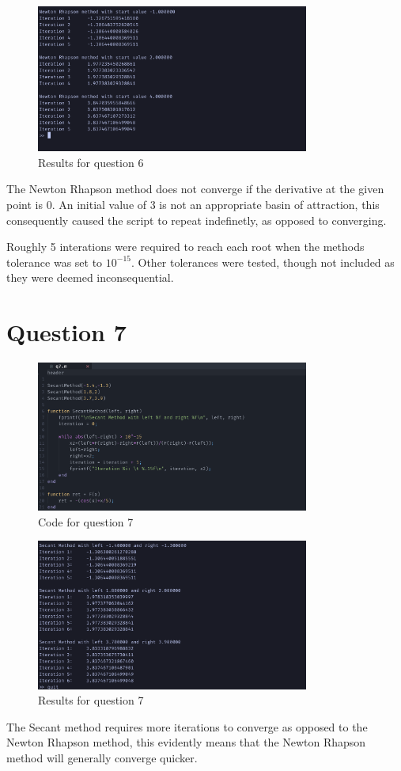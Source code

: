 \documentclass{article}
\begin{document}
\begin{figure}[H]
	\centering
	\includegraphics[width=0.8\textwidth]{imgs/q6_results.png}
	\caption{Results for question 6}
	\label{fig:q6_result}
\end{figure}
The Newton Rhapson method does not converge if the derivative at the given point is 0. An initial value of 3 is not an appropriate basin of attraction, this consequently caused the script to repeat indefinetly, as opposed to converging. 

Roughly 5 interations were required to reach each root when the methods tolerance was set to $10^{-15}$. Other tolerances were tested, though not included as they were deemed inconsequential.
\newpage
\section{Question 7}
\begin{figure}[H]
	\centering
	\includegraphics[width=0.8\textwidth]{imgs/q7_code.png}
	\caption{Code for question 7}
	\label{fig:q7_code}
\end{figure}

\begin{figure}[H]
	\centering
	\includegraphics[width=0.8\textwidth]{imgs/q7_results.png}
	\caption{Results for question 7}
	\label{fig:q7_result}
\end{figure}
The Secant method requires more iterations to converge as opposed to the Newton Rhapson method, this evidently means that the Newton Rhapson method will generally converge quicker.
\end{document}

